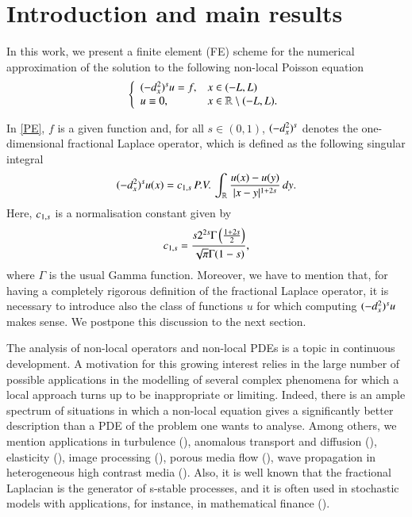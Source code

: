 \section{Introduction and main results}\label{intro_sec}

In this work, we present a finite element (FE) scheme for the numerical approximation of the solution to the following non-local Poisson equation
\begin{align}\label{PE}
	\left\{\begin{array}{ll}
		(-d_x^2)^{s}u = f, & x\in(-L,L)
		\\
		u\equiv 0, & x\in\mathbb{R}\setminus(-L,L).
	\end{array}\right.
\end{align}

In \eqref{PE}, $f$ is a given function and, for all $s\in(0,1)$, $(-d_x^2)^{s}$ denotes the one-dimensional fractional Laplace operator, which is defined as the following singular integral
\begin{align*}
	(-d_x^2)^{s}u(x) = c_{1,s}\,P.V.\,\int_{\mathbb{R}}\frac{u(x)-u(y)}{|x-y|^{1+2s}}\,dy. 
\end{align*}
Here, $c_{1,s}$ is a normalisation constant given by
\begin{align*}
	c_{1,s} = \frac{s2^{2s}\Gamma\left(\frac{1+2s}{2}\right)}{\sqrt{\pi}\Gamma(1-s)},
\end{align*}
where $\Gamma$ is the usual Gamma function. Moreover, we have to mention that, for having a completely rigorous definition of the fractional Laplace operator, it is necessary to introduce also the class of functions $u$ for which computing $(-d_x^2)^{s}u$ makes sense. We postpone this discussion to the next section.

The analysis of non-local operators and non-local PDEs is a topic in continuous development.
A motivation for this growing interest relies in the large number of possible applications in the modelling of several complex phenomena for which a local approach turns up to be inappropriate or limiting.
Indeed, there is an ample spectrum of situations in which a non-local equation gives a
significantly better description than a PDE of the problem one wants to analyse.
Among others, we mention applications in turbulence (\cite{bakunin2008turbulence}), anomalous transport and diffusion (\cite{bologna2000anomalous,meerschaert2012fractional}), elasticity (\cite{dipierro2015dislocation}), image processing (\cite{gilboa2008nonlocal}), porous media flow (\cite{vazquez2012nonlinear}), wave propagation in heterogeneous high contrast media (\cite{zhu2014modeling}). Also, it is well known that the fractional Laplacian is the generator of s-stable processes, and it is often used in stochastic models with applications, for instance, in mathematical finance (\cite{levendorskii2004pricing,pham1997optimal}).

